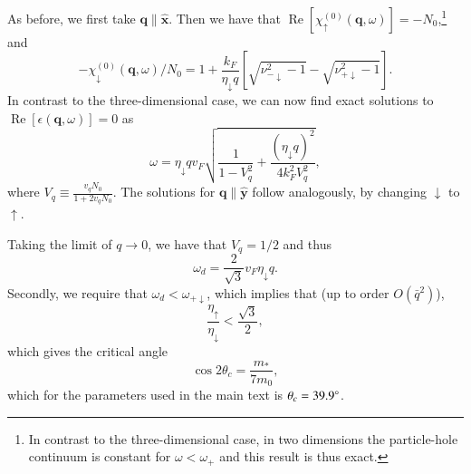 \documentclass[aps,prb,reprint,twocolumns,superscriptaddress,nofootinbib]{revtex4-2}
\DeclareMathOperator{\Ree}{Re}
\newcommand{\xx}{\hat{\bm{x}}}
\newcommand{\yy}{\hat{\bm{y}}}
\newcommand{\mdos}{\tilde{m}}
\newcommand{\kF}{k_{F}}
\begin{document}
	As before, we first take $\bm q\parallel\xx$. Then we have that $\Ree[\chi_{\uparrow}^{(0)}(\bm q,\omega)]=-N_0$,\footnote{In contrast to the three-dimensional case, in two dimensions the particle-hole continuum is constant for $\omega<\omega_{+}$ and this result is thus exact.}  and 
	\begin{equation}
		-\chi_\downarrow^{(0)} (\bm q,\omega) / N_0 = 1 + \frac{\kF}{\eta_\downarrow q} \left[\sqrt{\nu_{-\downarrow}^2-1}-\sqrt{\nu_{+\downarrow}^2-1}\right].
	\end{equation} 
	In contrast to the three-dimensional case, we can now find exact solutions to $\Ree[\epsilon(\bm q,\omega)]=0$ as \cite{agarwalLonglivedSpinPlasmons2014}
	\begin{equation}
		\omega = \eta_{\downarrow} qv_F \sqrt{\frac{1}{1-V_q^2} + \frac{(\eta_\downarrow q)^2}{4\kF^2V_q^2}},
	\end{equation}
	where $V_q \equiv \frac{v_qN_0}{1+2v_qN_0}$.
	The solutions for $\bm q\parallel \yy $  follow analogously, by changing $\downarrow$ to $\uparrow$. 
	
	Taking the limit of $q\rightarrow0$, we have that $V_q=1/2$ and thus
	\begin{equation}
		\omega_d=\frac{2}{\sqrt{3}} v_F \eta_\downarrow q. \label{eq:ws-2D}
	\end{equation}
	Secondly, we require that $\omega_{d}<\omega_{+\downarrow}$, which implies that (up to order $O(\bar q^2)$),
	\begin{equation}
		\frac{\eta_{\uparrow}}{\eta_{\downarrow}} < \frac{\sqrt{3}}{2}, \label{eq:stability-2D}
	\end{equation}
	which gives the critical angle
	\begin{equation}
		\cos2\theta_c =  \frac{m_*}{7m_0},
	\end{equation}
	which for the parameters used in the main text is $\theta_c=\SI{39.9}{\degree}$.
	
\end{document}
